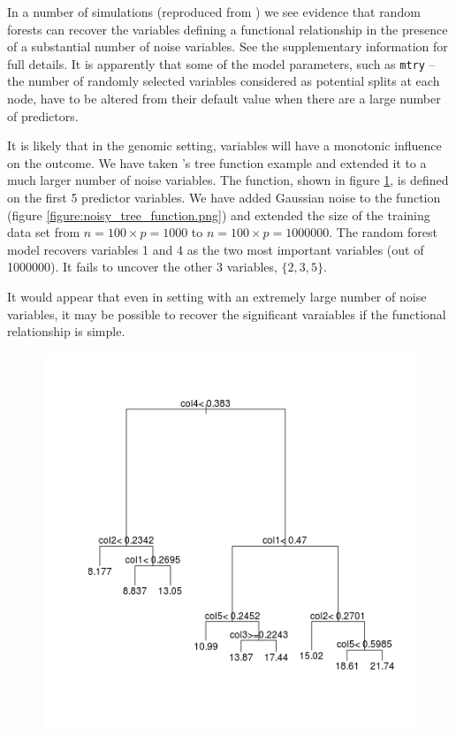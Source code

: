 \documentclass[10pt,letterpaper]{article}
\begin{document}
In a number of simulations (reproduced from \cite{Genuer.et.al.2010}) we see evidence that random forests can recover
the variables defining a functional relationship in the presence of a substantial number of noise variables. See the
supplementary information for full details. It is apparently that some of the model parameters, such
as \texttt{mtry} -- the number of randomly selected variables considered as potential splits at each node, have to be altered
from their default value when there are a large number of predictors.  


It is likely that in the genomic setting, variables will have a monotonic influence on the outcome. 
We have taken \cite{Genuer.et.al.2010}'s tree function example and extended it to a much larger number of noise variables.
The function, shown in figure  \ref{figure:tree_function.png}, is 
defined on the first 5 predictor variables. We have added Gaussian noise to the function (figure \ref{figure:noisy_tree_function.png})
and extended the size of the training data set from $n=100 \times p=1000$ to $n=100 \times  p=1000000$.
The random forest model recovers variables 1 and 4 as the two
most important variables (out of 1000000). It fails to uncover the other 3 variables, $\{2,3,5\}$.

It would appear that even in setting with an extremely large number of noise variables, it may be possible to recover
the significant varaiables if the functional relationship is simple.


\begin{figure}[tbhp]
 \includegraphics[totalheight=9cm]{./figs/tree_function.png}
  \label{figure:tree_function.png}
\end{figure}
\end{document}
